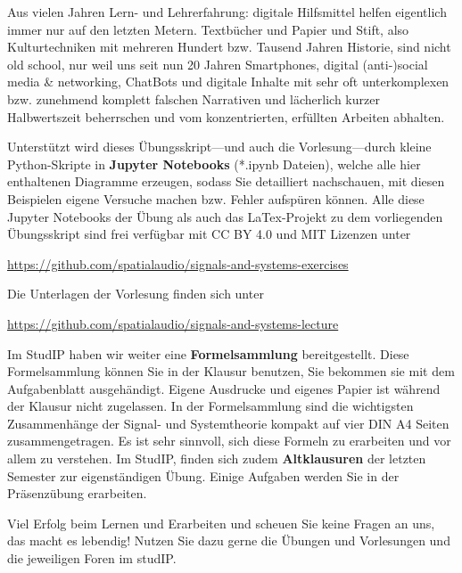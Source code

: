 Aus vielen Jahren Lern- und Lehrerfahrung: digitale Hilfsmittel helfen eigentlich immer nur auf den letzten Metern. Textbücher und Papier und Stift, also Kulturtechniken mit mehreren Hundert bzw. Tausend Jahren Historie, sind nicht old school, nur weil uns seit nun 20 Jahren Smartphones, digital (anti-)social media \& networking, ChatBots und digitale Inhalte mit sehr oft unterkomplexen bzw. zunehmend komplett falschen Narrativen und lächerlich kurzer Halbwertszeit beherrschen und vom konzentrierten, erfüllten Arbeiten abhalten.

Unterstützt wird dieses Übungsskript---und auch die Vorlesung---durch kleine Python-Skripte in
\textbf{Jupyter Notebooks} (*.ipynb Dateien),
welche alle hier enthaltenen Diagramme erzeugen, sodass Sie
detailliert nachschauen, mit diesen Beispielen eigene Versuche machen
bzw. Fehler aufspüren können.
%
Alle diese Jupyter Notebooks der Übung als auch das LaTex-Projekt zu dem vorliegenden Übungsskript sind frei verfügbar mit CC BY 4.0 und MIT Lizenzen unter
\begin{mdframed}[backgroundcolor=C2!10]
\url{https://github.com/spatialaudio/signals-and-systems-exercises}
\end{mdframed}
%
Die Unterlagen der Vorlesung finden sich unter
\begin{mdframed}[backgroundcolor=C2!10]
\url{https://github.com/spatialaudio/signals-and-systems-lecture}
\end{mdframed}


Im StudIP haben wir weiter eine \textbf{Formelsammlung} bereitgestellt.
%
Diese Formelsammlung können Sie in der Klausur benutzen, Sie bekommen sie
mit dem Aufgabenblatt ausgehändigt.
%
Eigene Ausdrucke und eigenes Papier ist während der Klausur nicht zugelassen.
%
In der Formelsammlung sind die wichtigsten Zusammenhänge der Signal- und
Systemtheorie kompakt auf vier DIN A4 Seiten zusammengetragen.
%
Es ist sehr sinnvoll, sich diese Formeln zu erarbeiten und vor allem zu verstehen.
%
Im StudIP, finden sich zudem \textbf{Altklausuren} der letzten Semester zur eigenständigen Übung. Einige Aufgaben werden Sie in der Präsenzübung erarbeiten.

Viel Erfolg beim Lernen und Erarbeiten und scheuen Sie keine Fragen an uns, das macht es lebendig!
Nutzen Sie dazu gerne die Übungen und Vorlesungen und die
jeweiligen Foren im studIP.


\newpage
